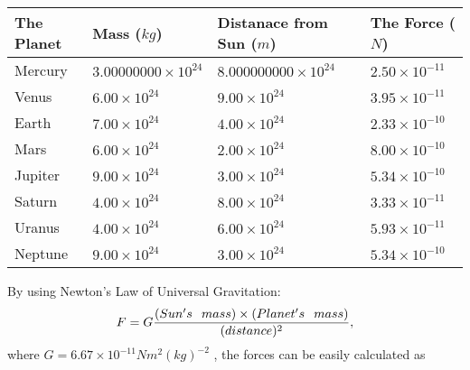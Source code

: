 \documentclass[12pt]{article}
\begin{document}
 
\begin{tabular}{|l|l|l|l|}
\hline
The Planet & Mass ($kg$) & Distanace from Sun ($m$) & The Force ($N$)\\
\hline
Mercury  &
           $ %
3.00000000 \times 10^{24} $   &
             $ %
8.000000000 \times 10^{24} $    & $ %
2.50 \times 10^{-11} $
\\  \hline
Venus    &
           $  %
6.00 \times 10^{24}  $     &
             $ %
9.00 \times 10^{24} $    & $ %
3.95 \times 10^{-11} $
\\  \hline
Earth    &
           $  %
7.00 \times 10^{24}  $     &
             $ %
4.00 \times 10^{24} $    & $ %
2.33 \times 10^{-10} $
\\   \hline
Mars     &
           $  %
6.00 \times 10^{24} $     &
             $ %
2.00 \times 10^{24} $    & $ %
8.00 \times 10^{-10} $
\\   \hline
Jupiter  &
           $  %
9.00 \times 10^{24} $    &
             $ %
3.00 \times 10^{24} $    & $ %
5.34 \times 10^{-10} $
\\  \hline
Saturn   &
           $  %
4.00 \times 10^{24} $    &
             $ %
8.00 \times 10^{24}  $    & $ %
3.33 \times 10^{-11} $
\\  \hline
Uranus   &
           $  %
4.00 \times 10^{24} $    &
             $ %
6.00 \times 10^{24} $    & $ %
5.93 \times 10^{-11} $
\\  \hline
Neptune  &
           $  %
9.00 \times 10^{24} $    &
             $ %
3.00 \times 10^{24} $    & $ %
5.34 \times 10^{-10} $
\\  \hline
 
\end{tabular}
 
 
 
 
\noindent{}
 
 

 
 
 
 
\noindent{}
 
 

By using Newton's Law of Universal Gravitation:
\[
F=G \frac{(Sun's \hspace{0.1in} mass) \times (Planet's \hspace{0.1in} mass)} { (distance)^2},
\]
where
$ G= %
6.67 \times 10^{-11} N m^{2}(kg)^{-2}$ , the forces can be easily calculated as
 
\end{document}
